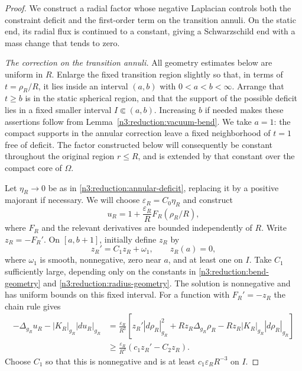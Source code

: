 \begin{proof}
We construct a radial factor whose negative Laplacian controls both the
constraint deficit and the first-order term on the transition annuli. On the static end, its
radial flux is continued to a constant, giving a Schwarzschild end
with a mass change that tends to zero.

\emph{The correction on the transition annuli.} All geometry estimates
below are uniform in $R$. Enlarge the fixed
transition region slightly so that, in terms of $t=\rho_R/R$, it lies
inside an interval $(a,b)$ with $0<a<b<\infty$.  Arrange that $t\ge b$
is in the static spherical region, and that the support of the possible
deficit lies in a fixed smaller interval $I\Subset(a,b)$.  Increasing
$b$ if needed makes these assertions follow from
Lemma~\ref{n3:reduction:vacuum-bend}.
We take $a=1$: the compact supports in the annular correction leave
a fixed neighborhood of $t=1$ free of deficit.  The factor constructed
below will consequently be constant throughout the original region
$r\le R$, and is extended by that constant over the compact core of $\Omega$.

Let $\eta_R\to0$ be as in
\eqref{n3:reduction:annular-deficit}, replacing it by a positive
majorant if necessary.  We will choose $\varepsilon_R=C_0\eta_R$ and
construct
\[
 u_R=1+\frac{\varepsilon_R}{R}F_R(\rho_R/R),
\]
where $F_R$ and the relevant derivatives are bounded independently of
$R$.  Write $z_R=-F_R'$.  On $[a,b+1]$, initially define $z_R$ by
\begin{equation}
 \label{n3:reduction:repair-ode}
 z_R'=C_1z_R+\omega_1,
 \qquad z_R(a)=0,
\end{equation}
where $\omega_1$ is smooth, nonnegative, zero near $a$, and at least one
on $I$.  Take $C_1$ sufficiently large, depending only on the constants
in \eqref{n3:reduction:bend-geometry} and
\eqref{n3:reduction:radius-geometry}.  The solution is nonnegative and
has uniform bounds on this fixed interval.  For a function with
$F_R'=-z_R$ the chain rule gives
\begin{align*}
 -\Delta_{g_R}u_R-|K_R|_{g_R}|du_R|_{g_R}
 &=\frac{\varepsilon_R}{R^3}
   \left[z_R'|d\rho_R|_{g_R}^2
       +Rz_R\Delta_{g_R}\rho_R
       -Rz_R|K_R|_{g_R}|d\rho_R|_{g_R}\right]\\
 &\ge\frac{\varepsilon_R}{R^3}
       (c_1z_R'-C_2z_R).
\end{align*}
Choose $C_1$ so that this is nonnegative and is at least
$c_1\varepsilon_RR^{-3}$ on $I$.


\end{proof}
